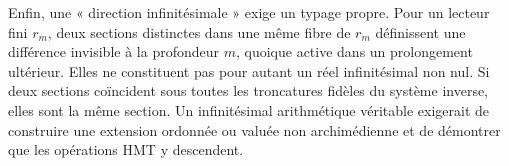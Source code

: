 Enfin, une « direction infinitésimale » exige un typage propre. Pour un
lecteur fini \(r_m\), deux sections distinctes dans une même fibre de \(r_m\)
définissent une différence invisible à la profondeur \(m\), quoique active dans un
prolongement ultérieur. Elles ne constituent pas pour autant un réel infinitésimal non nul.
Si deux sections coïncident sous toutes les troncatures fidèles du système
inverse, elles sont la même section. Un infinitésimal arithmétique véritable exigerait de
construire une extension ordonnée ou valuée non archimédienne et de démontrer que les
opérations HMT y descendent.

